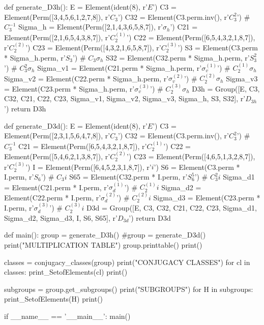 \documentclass[a4paper,10pt]{article}
\begin{document}
\begin{Python}
def generate_D3h():
    E = Element(ident(8), r'$E$')
    C3 = Element(Perm([3,4,5,6,1,2,7,8]), r'$C_3$')
    C32 = Element(C3.perm.inv(), r'$C_3^2$')                            # $C_3^{-1}$
    Sigma_h = Element(Perm([2,1,4,3,6,5,8,7]), r'$\sigma_h$')
    C21 = Element(Perm([2,1,6,5,4,3,8,7]), r'$C_2^{(1)}$')
    C22 = Element(Perm([6,5,4,3,2,1,8,7]), r'$C_2^{(2)}$')
    C23 = Element(Perm([4,3,2,1,6,5,8,7]), r'$C_2^{(3)}$')
    S3 = Element(C3.perm * Sigma_h.perm, r'$S_3$')                      # $C_3 \sigma_h$
    S32 = Element(C32.perm * Sigma_h.perm, r'$S_3^2$')                  # $C_3^2 \sigma_h$
    Sigma_v1 = Element(C21.perm * Sigma_h.perm, r'$\sigma_v^{(1)}$')    # $C_2^{(1)} \sigma_h$
    Sigma_v2 = Element(C22.perm * Sigma_h.perm, r'$\sigma_v^{(2)}$')    # $C_2^{(2)} \sigma_h$
    Sigma_v3 = Element(C23.perm * Sigma_h.perm, r'$\sigma_v^{(3)}$')    # $C_2^{(3)} \sigma_h$
    D3h = Group([E, C3, C32, C21, C22, C23, Sigma_v1,
                 Sigma_v2, Sigma_v3, Sigma_h, S3, S32], r'$D_{3h}$')
    return D3h

def generate_D3d():
    E = Element(ident(8), r'$E$')
    C3 = Element(Perm([2,3,1,5,6,4,7,8]), r'$C_3$')
    C32 = Element(C3.perm.inv(), r'$C_3^2$')                    # $C_3^{-1}$
    C21 = Element(Perm([6,5,4,3,2,1,8,7]), r'$C_2^{(1)}$')
    C22 = Element(Perm([5,4,6,2,1,3,8,7]), r'$C_2^{(2)}$')
    C23 = Element(Perm([4,6,5,1,3,2,8,7]), r'$C_2^{(3)}$')
    I = Element(Perm([6,4,5,2,3,1,8,7]), r'$i$')
    S6 = Element(C3.perm * I.perm, r'$S_6$')                    # $C_3 i$
    S65 = Element(C32.perm * I.perm, r'$S_6^5$')                # $C_3^2 i$
    Sigma_d1 = Element(C21.perm * I.perm, r'$\sigma_d^{(1)}$')  # $C_2^{(1)} i$
    Sigma_d2 = Element(C22.perm * I.perm, r'$\sigma_d^{(2)}$')  # $C_2^{(2)} i$
    Sigma_d3 = Element(C23.perm * I.perm, r'$\sigma_d^{(3)}$')  # $C_2^{(3)} i$
    D3d = Group([E, C3, C32, C21, C22, C23,
                 Sigma_d1, Sigma_d2, Sigma_d3, I, S6, S65], r'$D_{3d}$')
    return D3d

def main():
    group = generate_D3h()
    #group = generate\_D3d()
    print("MULTIPLICATION TABLE")
    group.printtable()
    print()

    classes = conjugacy_classes(group)
    print("CONJUGACY CLASSES")
    for cl in classes:
        print_SetofElements(cl)
    print()

    subgroups = group.get_subgroups()
    print("SUBGROUPS")
    for H in subgroups:
        print_SetofElements(H)
    print()

if __name__ == '__main__':
    main()
\end{Python}
\end{document}
